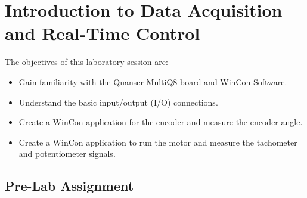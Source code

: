\chapter{Introduction to Data Acquisition and Real-Time Control}

The objectives of this laboratory session are:
\begin{itemize}
\item
    Gain familiarity with the Quanser MultiQ8 board and WinCon Software.
\item
    Understand the basic input/output (I/O) connections.
\item
    Create a WinCon application for the encoder and measure the encoder angle.
\item
    Create a WinCon application to run the motor and measure the tachometer and potentiometer signals.
\end{itemize}

\section{Pre-Lab Assignment}


